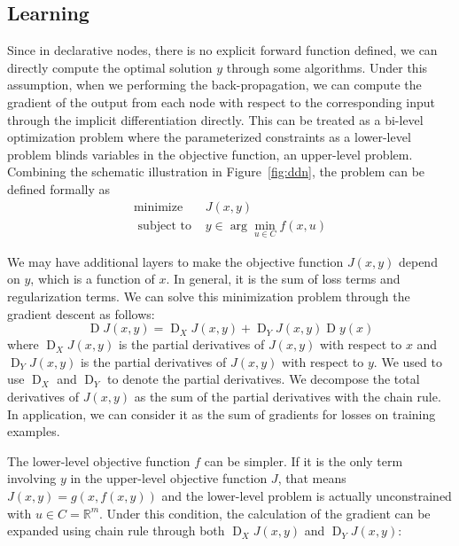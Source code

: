 \subsection{Learning}
Since in declarative nodes, there is no explicit forward function defined, we can directly compute the optimal solution $y$ through some algorithms. Under this assumption, when we performing the back-propagation, we can compute the gradient of the output from each node with respect to the corresponding input through the implicit differentiation directly. This can be treated as a bi-level optimization problem\citep{BJ:98} where the parameterized constraints as a lower-level problem blinds variables in the objective function, an upper-level problem. Combining the schematic illustration in Figure~\ref{fig:ddn}, the problem can be defined formally as
\begin{equation}
    \begin{array}{ll}\operatorname{minimize} & J(x, y) \\ \text { subject to } & y \in \arg \min _{u \in C} f(x, u)\end{array}
\end{equation}
\par We may have additional layers to make the objective function $J(x, y)$ depend on $y$, which is a function of $x$. In general, it is the sum of loss terms and regularization terms. We can solve this minimization problem through the gradient descent as follows:
\begin{equation}
    \operatorname{D}J(x,y) = \operatorname{D}_XJ(x,y) + \operatorname{D}_YJ(x,y)\operatorname{D}y(x)
\end{equation}
where $\operatorname{D}_XJ(x,y)$ is the partial derivatives of $J(x,y)$ with respect to $x$ and $\operatorname{D}_YJ(x,y)$ is the partial derivatives of $J(x,y)$ with respect to $y$. We used to use $\operatorname{D}_X$ and $\operatorname{D}_Y$ to denote the partial derivatives. We decompose the total derivatives of $J(x,y)$ as the sum of the partial derivatives with the chain rule. In application, we can consider it as the sum of gradients for losses on training examples. 
\par The lower-level objective function $f$ can be simpler. If it is the only term involving $y$ in the upper-level objective function $J$, that means $J(x,y) = g(x, f(x,y))$ and the lower-level problem is actually unconstrained with $u \in C=\mathbb{R}^m$. Under this condition, the calculation of the gradient can be expanded using chain rule through both $\operatorname{D}_XJ(x,y)$ and $\operatorname{D}_YJ(x,y)$:
